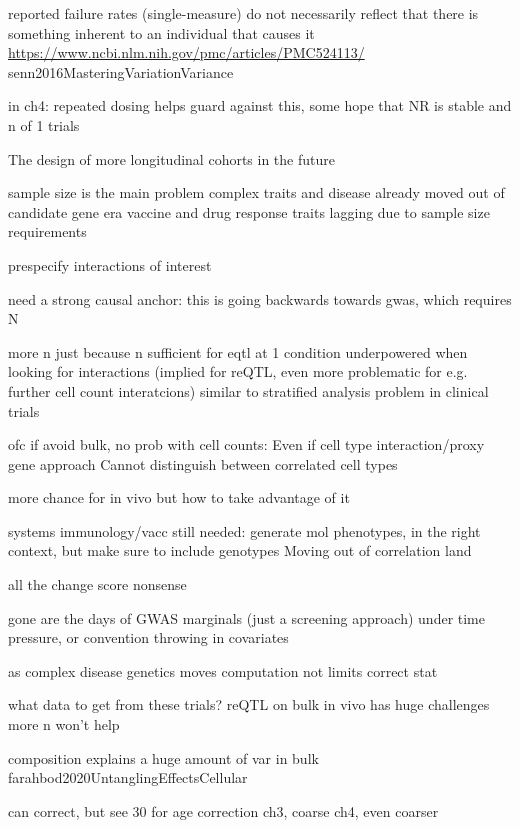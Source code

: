 \begin{outline}
            reported failure rates (single-measure) do not necessarily reflect that there is something inherent to an individual that causes it \url{https://www.ncbi.nlm.nih.gov/pmc/articles/PMC524113/} senn2016MasteringVariationVariance

                in ch4: repeated dosing helps guard against this, some hope that NR is stable
                and n of 1 trials

The design of more longitudinal cohorts in the future

    sample size is the main problem
        complex traits and disease already moved out of candidate gene era
        vaccine and drug response traits lagging due to sample size requirements

        prespecify interactions of interest

    need a strong causal anchor: this is going backwards towards gwas, which requires N

    more n
        just because n sufficient for eqtl at 1 condition
        underpowered when looking for interactions (implied for reQTL, even more problematic for e.g. further cell count interatcions)
        similar to stratified analysis problem in clinical trials

    ofc if avoid bulk, no prob with cell counts:
        Even if cell type interaction/proxy gene approach
        Cannot distinguish between correlated cell types

    more chance for in vivo
        but how to take advantage of it

    systems immunology/vacc still needed: generate mol phenotypes, in the right context,
    but make sure to include genotypes
    Moving out of correlation land

    all the change score nonsense

    gone are the days of GWAS marginals (just a screening approach)
        under time pressure, or convention
        throwing in covariates

    as     complex disease genetics moves 
    computation not limits correct stat

what data to get from these trials?
reQTL on bulk in vivo has huge challenges
more n won't help

    composition explains a huge amount of var in bulk farahbod2020UntanglingEffectsCellular

    can correct, but see 30 for age correction
        ch3, coarse
        ch4, even coarser


\end{outline}
